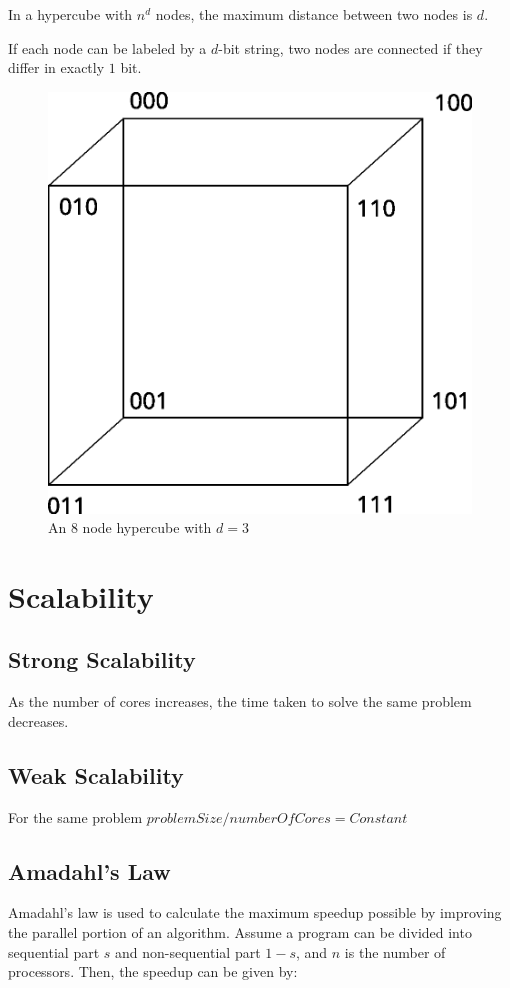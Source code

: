 \documentclass[twoside]{article}
\begin{document}
In a hypercube with $n ^d$ nodes, the maximum distance between two nodes is
$ d $.

If each node can be labeled by a $d$-bit string, two nodes are connected if they differ in exactly
$1$ bit.

\begin{figure}[!ht]
\centering
\includegraphics[scale=0.3]{cube.eps}
\caption{An 8 node hypercube with $d = 3 $}
\end{figure}

\section{Scalability}
\subsection{Strong Scalability}
As the number of cores increases, the time taken to solve the same problem decreases.

\subsection{Weak Scalability}
For the same problem $ problemSize / numberOfCores = Constant $

\subsection{Amadahl's Law}
Amadahl's law is used to calculate the maximum speedup possible by improving the parallel portion
of an algorithm. Assume a program can be divided into sequential part $s$ and non-sequential part
$ 1 - s $, and $n$ is the number of processors. Then, the speedup can be given by:
\end{document}
